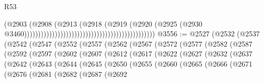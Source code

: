 \begin{lexlean}{R53}
\begin{coremodule}
                                                                                  (@2903
                                                                                    (@2908
                                                                                      (@2913
                                                                                        (@2918
                                                                                          (@2919
                                                                                            (@2920
                                                                                              (@2925
                                                                                                (@2930
                                                                                                  @3460)))))))))))))))))))))))))))))))))))))))))))))))
@3556 := @2527
    (@2532
      (@2537
        (@2542
          (@2547
            (@2552
              (@2557
                (@2562
                  (@2567
                    (@2572
                      (@2577
                        (@2582
                          (@2587
                            (@2592
                              (@2597
                                (@2602
                                  (@2607
                                    (@2612
                                      (@2617
                                        (@2622
                                          (@2627
                                            (@2632
                                              (@2637
                                                (@2642
                                                  (@2643
                                                    (@2644
                                                      (@2645
                                                        (@2650
                                                          (@2655
                                                            (@2660
                                                              (@2665
                                                                (@2666
                                                                  (@2671
                                                                    (@2676
                                                                      (@2681
                                                                        (@2682
                                                                          (@2687
                                                                            (@2692

\end{coremodule}
\end{lexlean}
